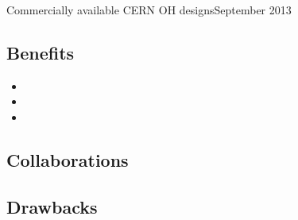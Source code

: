 \documentclass[compress,red]{beamer}
\begin{document}
\begin{frame}{Commercially available CERN OH designs}{September 2013}
\begin{table}
\subsection{Benefits}

\begin{frame}{}

  \begin{block}{}
    \begin{itemize}
    \item
    \item
    \item
    \end{itemize}
  \end{block}

\end{frame}

\subsection{Collaborations}


\subsection{Drawbacks}




\end{table}
\end{frame}
\end{document}
